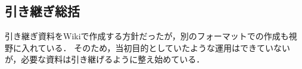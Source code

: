 \subsection*{引き継ぎ総括}


引き継ぎ資料をWikiで作成する方針だったが，別のフォーマットでの作成も視野に入れている．
そのため，当初目的としていたような運用はできていないが，必要な資料は引き継げるように整え始めている．